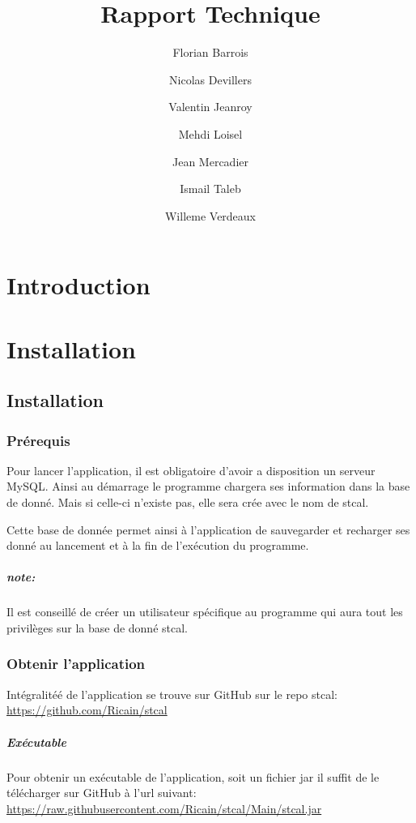 \documentclass[a4paper,10pt]{report}
\title{Rapport Technique}
\author{Florian Barrois \and Nicolas Devillers \and Valentin Jeanroy \and Mehdi Loisel \and Jean Mercadier \and Ismail Taleb \and Willeme Verdeaux}
\begin{document}
\thispagestyle{headings}

\maketitle

\tableofcontents

\chapter*{Introduction}

\chapter{Installation}

	\section{Installation}

		\subsection{Prérequis}

			Pour lancer l'application, il est obligatoire d'avoir a disposition un serveur MySQL. Ainsi au démarrage le programme chargera ses information dans la base de donné. Mais si celle-ci n'existe pas, elle sera crée avec le nom de stcal.

			Cette base de donnée permet ainsi à l'application de sauvegarder et recharger ses donné au lancement et à la fin de l’exécution du programme.

			\paragraph*{note:}
			Il est conseillé de créer un utilisateur spécifique au programme qui aura tout les privilèges sur la base de donné stcal.

		\subsection{Obtenir l'application}

			Intégralitéé de l'application se trouve sur GitHub sur le repo stcal: \href{https://github.com/Ricain/stcal}{https://github.com/Ricain/stcal}
	
			\paragraph[Binaire]{Exécutable}
			Pour obtenir un exécutable de l'application, soit un fichier jar il suffit de le télécharger sur GitHub à l'url suivant: \href{https://raw.githubusercontent.com/Ricain/stcal/Main/stcal.jar}{https://raw.githubusercontent.com/Ricain/stcal/Main/stcal.jar}
\end{document}
